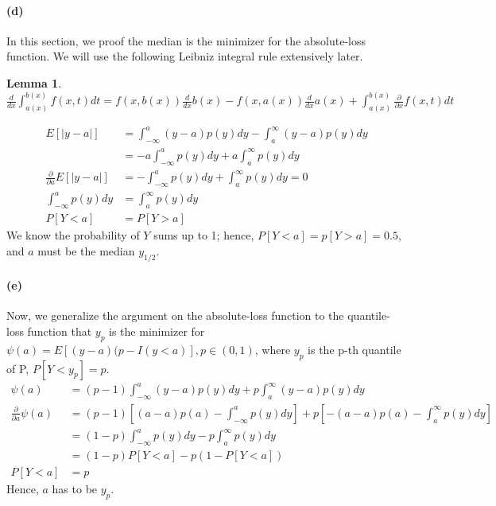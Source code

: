 \documentclass[11pt, letterpaper]{article}
\newtheorem{lemma}{Lemma}
\begin{document}
\paragraph{(d)} In this section, we proof the median is the minimizer for the absolute-loss function. We will use the following Leibniz integral rule extensively later.
\begin{lemma}$
    \frac{d}{dx} \int_{a(x)}^{b(x)} f(x, t) dt
        = f(x, b(x)) \frac{d}{dx}b(x) - f(x, a(x))\frac{d}{dx}a(x) + \int_{a(x)}^{b(x)} \frac{\partial}{\partial x} f(x, t) dt
$\end{lemma}
\begin{align*}
    E[|y-a|] &= \int_{-\infty}^a (y-a) p(y) dy - \int_{a}^{\infty} (y-a) p(y) dy \\
        &= -a \int_{-\infty}^a p(y) dy + a \int_{a}^{\infty} p(y) dy \\
    \frac{\partial}{\partial a} E[|y-a|] &= - \int_{-\infty}^a p(y) dy + \int_{a}^{\infty} p(y) dy = 0 \\
        \int_{-\infty}^a p(y) dy &= \int_{a}^{\infty} p(y) dy \\
        P[Y < a] &= P[Y > a]
\end{align*}
We know the probability of $Y$ sums up to 1; hence, $P[Y<a] = p[Y>a] = 0.5$, and $a$ must be the median $y_{1/2}$.

\paragraph{(e)}Now, we generalize the argument on the absolute-loss function to the quantile-loss function that $y_p$ is the minimizer for
$\psi(a) = E[(y-a)(p - I(y<a)], p \in (0,1)$, where $y_p$ is the p-th quantile of P, $P[Y<y_p] = p$.
\begin{align*}
    \psi(a) &= (p-1) \int_{-\infty}^{a} (y-a) p(y) dy + p \int_{a}^{\infty} (y-a) p(y) dy \\
    \frac{\partial}{\partial a} \psi(a)
        &= (p-1) \left[(a-a)p(a) - \int_{-\infty}^{a} p(y) dy \right] + p \left[-(a-a)p(a) - \int_{a}^{\infty} p(y) dy \right] \\
        &= (1-p) \int_{-\infty}^{a} p(y) dy - p \int_{a}^{\infty} p(y) dy \\
        &= (1-p) P[Y<a] - p ( 1- P[Y<a]) \\
    P[Y<a] &= p
\end{align*}
Hence, $a$ has to be $y_p$.
\end{document}
